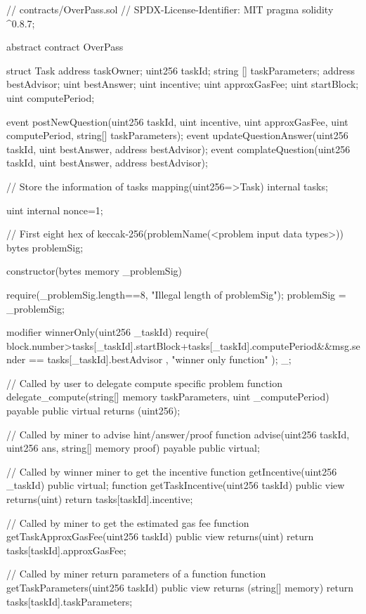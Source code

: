 \begin{solidity}
// contracts/OverPass.sol
// SPDX-License-Identifier: MIT
pragma solidity ^0.8.7;

abstract contract OverPass {

    struct Task {
        address taskOwner;
        uint256 taskId;
        string [] taskParameters;
        address bestAdvisor;
        uint bestAnswer;
        uint incentive;
        uint approxGasFee;
        uint startBlock;
        uint computePeriod;
    }


    event postNewQuestion(uint256 taskId, uint incentive, uint approxGasFee, uint computePeriod, string[] taskParameters);
    event updateQuestionAnswer(uint256 taskId, uint bestAnswer, address bestAdvisor);
    event complateQuestion(uint256 taskId, uint bestAnswer, address bestAdvisor);


    // Store the information of tasks
    mapping(uint256=>Task) internal tasks;

    uint internal nonce=1;

    // First eight hex of keccak-256(problemName(<problem input data types>))
    bytes problemSig;

    constructor(bytes memory _problemSig) {
        require(_problemSig.length==8, "Illegal length of problemSig");
        problemSig = _problemSig;

    }

    modifier winnerOnly(uint256 _taskId) {
        require(
            block.number>tasks[_taskId].startBlock+tasks[_taskId].computePeriod&&msg.sender == tasks[_taskId].bestAdvisor ,
            "winner only function"
        );
        _;
    }

    

    // Called by user to delegate compute specific problem
    function delegate_compute(string[] memory taskParameters, uint _computePeriod) payable public virtual returns (uint256);

    // Called by miner to advise hint/answer/proof
    function advise(uint256 taskId, uint256 ans, string[] memory proof) payable public virtual;

    // Called by winner miner to get the incentive
    function getIncentive(uint256 _taskId) public virtual;
        function getTaskIncentive(uint256 taskId) public view returns(uint) {
        return tasks[taskId].incentive;
    }

    // Called by miner to get the estimated gas fee
    function getTaskApproxGasFee(uint256 taskId) public view returns(uint){
        return tasks[taskId].approxGasFee;
    }
    
    // Called by miner return parameters of a function
    function getTaskParameters(uint256 taskId) public view returns (string[] memory){
        return tasks[taskId].taskParameters;
    }
}

\end{solidity}
